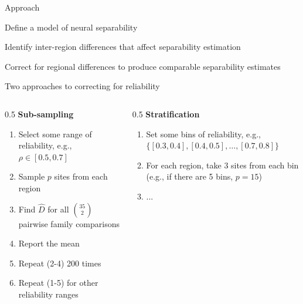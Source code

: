 \documentclass[aspectratio=169, handout]{beamer}
\begin{document}
\begin{frame}{Approach}
    \begin{enumerate}
        {\color{gray} \item Define a model of neural separability}
        {\color{gray} \item  Identify inter-region differences that affect separability estimation }
        \item  Correct for regional differences to produce comparable separability estimates
    \end{enumerate}
\end{frame}

\begin{frame}{Two approaches to correcting for reliability}
\begin{columns}
\begin{column}{0.5\textwidth}
\textbf{Sub-sampling}
    \begin{enumerate}
        \item Select some range of reliability, e.g., \( \rho \in [0.5, 0.7] \) \pause 
        \item Sample \( p \) sites from each region \pause 
        \item Find \( \hat{D} \) for all \( \binom{35}{2} \) pairwise family comparisons \pause
        \item Report the mean \pause
        \item Repeat (2-4) 200 times \pause 
        \item Repeat (1-5) for other reliability ranges \pause 
    \end{enumerate}
\end{column}
\begin{column}{0.5\textwidth}
\textbf{Stratification}
    \begin{enumerate}
        \item Set some bins of reliability, e.g., \( \{ [0.3, 0.4], [0.4, 0.5], \dots, [0.7, 0.8]\} \) \pause 
        \item For each region, take 3 sites from each bin (e.g., if there are 5 bins, \( p = 15 \)) \pause
        \item ... 
    \end{enumerate}
\end{column}
\end{columns}
\end{frame}
\end{document}
